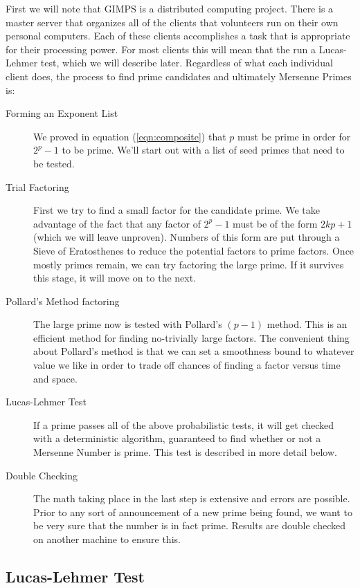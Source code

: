 First we will note that GIMPS is a distributed computing project.  There is a master server that organizes all of the clients that volunteers run on their own personal computers.  Each of these clients accomplishes a task that is appropriate for their processing power.  For most clients this will mean that the run a Lucas-Lehmer test, which we will describe later.  Regardless of what each individual client does, the process to find prime candidates and ultimately Mersenne Primes is:
\begin{description}
\item[Forming an Exponent List]  We proved in equation (\ref{eqn:composite}) that $p$ must be prime in order for $2^p - 1$ to be prime.  We'll start out with a list of seed primes that need to be tested.
\item[Trial Factoring] First we try to find a small factor for the candidate prime.  We take advantage of the fact that any factor of $2^p - 1$ must be of the form $2kp +1$ (which we will leave unproven).  Numbers of this form are put through a Sieve of Eratosthenes to reduce the potential factors to prime factors.  Once mostly primes remain, we can try factoring the large prime. If it survives this stage, it will move on to the next.
\item[Pollard's Method factoring] The large prime now is tested with Pollard's $(p - 1)$ method.  This is an efficient method for finding no-trivially large factors.  The convenient thing about Pollard's method is that we can set a smoothness bound to whatever value we like in order to trade off chances of finding a factor versus time and space.
\item[Lucas-Lehmer Test] If a prime passes all of the above probabilistic tests, it will get checked with a deterministic algorithm, guaranteed to find whether or not a Mersenne Number is prime.  This test is described in more detail below.
\item[Double Checking] The math taking place in the last step is extensive and errors are possible.  Prior to any sort of announcement of a new prime being found, we want to be very sure that the number is in fact prime.  Results are double checked on another machine to ensure this.
\end{description}

\subsection{Lucas-Lehmer Test}
\label{sec:llt}

